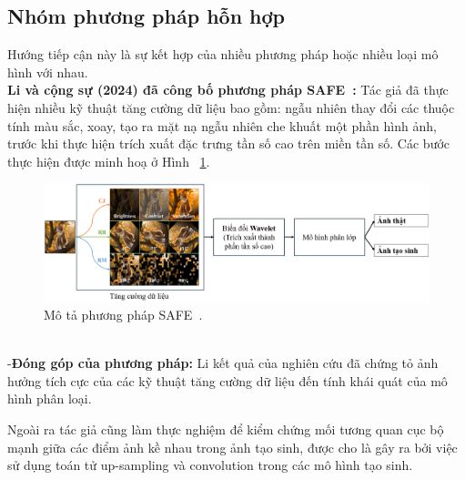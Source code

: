 \subsection{Nhóm phương pháp hỗn hợp}
Hướng tiếp cận này là sự kết hợp của nhiều phương pháp hoặc nhiều loại mô hình với nhau.\\
%
\textbf{Li và cộng sự (2024) đã công bố phương pháp SAFE~\cite{li2024improving}:}
%
Tác giả đã thực hiện nhiều kỹ thuật tăng cường dữ liệu bao gồm: ngẫu nhiên thay đổi các thuộc tính màu sắc, xoay, tạo ra mặt nạ ngẫu nhiên che khuất một phần hình ảnh, trước khi thực hiện trích xuất đặc trưng tần số cao trên miền tần số. Các bước thực hiện được minh hoạ ở Hình ~\ref{fig:model-SAFE-1}. 
%	
\begin{figure}[h]
	\centering
	\includegraphics[width=1.0\linewidth]{Images/model-SAFE-1.png}	\begin{minipage}{0.9\linewidth}
		\caption{Mô tả phương pháp SAFE~\cite{li2024improving}.}
		\label{fig:model-SAFE-1}
	\end{minipage}
\end{figure}\\
%
%
%
-\textbf{Đóng góp của phương pháp:}
%
Li kết quả của nghiên cứu đã chứng tỏ ảnh hưởng tích cực của các kỹ thuật tăng cường dữ liệu đến tính khái quát của mô hình phân loại.

Ngoài ra tác giả cũng làm thực nghiệm để kiểm chứng mối tương quan cục bộ mạnh giữa các điểm ảnh kề nhau trong ảnh tạo sinh, được cho là gây ra bởi việc sử dụng toán tử \gls{up-sampling} và \gls{convolution} trong các mô hình tạo sinh.
%

%






